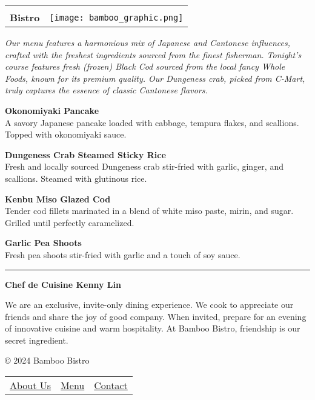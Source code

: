 \documentclass[12pt]{article}
\newcommand{\menuItem}[2]{
  \vspace{3em}
  \noindent\textbf{\Large #1}\\
  \normalsize #2\par
}
\begin{document}
\begin{center}
\begin{tabular}{@{}c@{\hskip 0.1cm}c@{}}
\begin{minipage}{0.23\textwidth}
\raggedleft
{\Huge\textbf{Bamboo}}\\[0.15cm]
{\Huge\textbf{Bistro}}
\end{minipage}
&
\begin{minipage}{0.12\textwidth}
\centering
\texttt{[image: bamboo\_graphic.png]}
\end{minipage}
\end{tabular}

\end{center}

\vspace{0.25cm}

\noindent\small\textit{Our menu features a harmonious mix of Japanese and Cantonese influences, crafted with the freshest ingredients sourced from the finest fisherman. Tonight's course features fresh (frozen) Black Cod sourced from the local fancy Whole Foods, known for its premium quality. Our Dungeness crab, picked from C-Mart, truly captures the essence of classic Cantonese flavors.}

\vspace{1em}

\menuItem{Okonomiyaki Pancake}{A savory Japanese pancake loaded with cabbage, tempura flakes, and scallions. Topped with okonomiyaki sauce.}

\menuItem{Dungeness Crab Steamed Sticky Rice}{Fresh and locally sourced Dungeness crab stir-fried with garlic, ginger, and scallions. Steamed with glutinous rice.}

\menuItem{Kenbu Miso Glazed Cod}{Tender cod fillets marinated in a blend of white miso paste, mirin, and sugar. Grilled until perfectly caramelized.}

\menuItem{Garlic Pea Shoots}{Fresh pea shoots stir-fried with garlic and a touch of soy sauce.}

\vspace{2cm}

\vfill

\begin{center}
\rule{\textwidth}{0.4pt}

\begin{center}
\normalsize \textbf{Chef de Cuisine Kenny Lin}
\end{center}

\small{
We are an exclusive, invite-only dining experience. We cook to appreciate our friends and share the joy of good company. When invited, prepare for an evening of innovative cuisine and warm hospitality. At Bamboo Bistro, friendship is our secret ingredient.
}

\vspace{0.5cm}

\footnotesize
© 2024 Bamboo Bistro

\vspace{0.5em}
\begin{tabular}{ccc}
\href{https://asianamericancenter.northeastern.edu/}{About Us} &
\href{./}{Menu} &
\href{https://linkedin.com/in/kennylin24/}{Contact}
\end{tabular}
\end{center}
\end{document}
